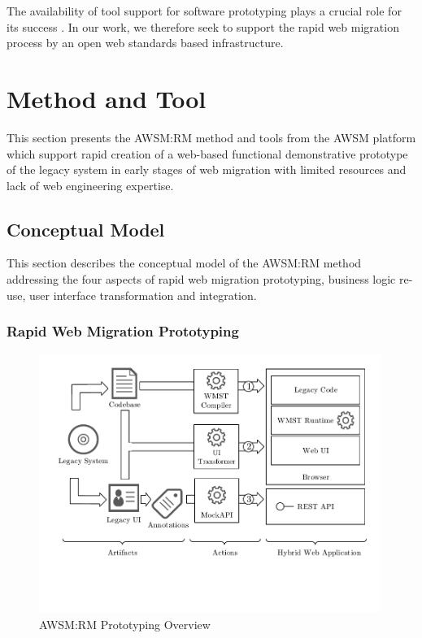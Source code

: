 The availability of tool support for software prototyping plays a crucial role for its success \autocite{Tripp1990}.
In our work, we therefore seek to support the rapid web migration process by an open web standards based infrastructure.

\hypertarget{method-and-tool}{%
\section{Method and Tool}\label{method-and-tool}}

This section presents the AWSM:RM method and tools from the AWSM platform which support rapid creation of a web-based functional demonstrative prototype of the legacy system in early stages of web migration with limited resources and lack of web engineering expertise.

\hypertarget{conceptual-model}{%
\subsection{Conceptual Model}\label{conceptual-model}}

This section describes the conceptual model of the AWSM:RM method addressing the four aspects of rapid web migration prototyping, business logic re-use, user interface transformation and integration.

\hypertarget{sec:rwmp}{%
\subsubsection{Rapid Web Migration Prototyping}\label{sec:rwmp}}

\begin{figure}
\hypertarget{fig:awsm.rm.overview}{%
\centering
\includegraphics[width=0.99\textwidth]{../figures/rewamp/wms3.pdf}
\caption{AWSM:RM Prototyping Overview}\label{fig:awsm.rm.overview}
}
\end{figure}

